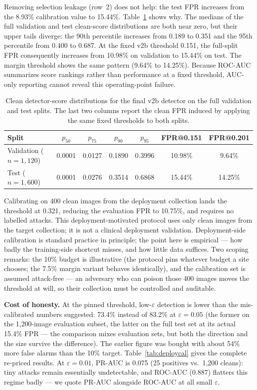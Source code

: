 \documentclass[runningheads]{llncs}
\begin{document}
Removing selection leakage (row~2) does not help: the test FPR increases
from the 8.93\% calibration value to 15.44\%. Table~\ref{tab:shift}
shows why. The medians of the full validation and test clean-score
distributions are both near zero, but their upper tails diverge: the
90th percentile increases from 0.189 to 0.351 and the 95th percentile
from 0.400 to 0.687. At the fixed v2b threshold 0.151, the full-split
FPR consequently increases from 10.98\% on validation to 15.44\% on
test. The margin threshold shows the same pattern (9.64\% to 14.25\%).
Because ROC-AUC summarizes score rankings rather than performance at a
fixed threshold, AUC-only reporting cannot reveal this operating-point
failure.

\begin{table}
\centering
\caption{Clean detector-score distributions for the final v2b detector
on the full validation and test splits. The last two columns report the
clean FPR induced by applying the same fixed thresholds to both splits.}
\label{tab:shift}
\begin{tabular}{lcccccc}
\toprule
Split & $p_{50}$ & $p_{75}$ & $p_{90}$ & $p_{95}$ & FPR@0.151 & FPR@0.201 \\
\midrule
Validation ($n{=}1{,}120$) & 0.0001 & 0.0127 & 0.1890 & 0.3996 & 10.98\% & 9.64\% \\
Test ($n{=}1{,}600$)       & 0.0001 & 0.0276 & 0.3514 & 0.6868 & 15.44\% & 14.25\% \\
\bottomrule
\end{tabular}
\end{table}

Calibrating on 400 clean images from the deployment collection lands the
threshold at 0.321, reducing the evaluation FPR to 10.75\%, and requires
no labelled attacks. This deployment-motivated protocol uses only clean
images from the target collection; it is not a clinical deployment
validation. Deployment-side calibration is standard practice in principle; the
point here is empirical --- how badly the training-side shortcut misses,
and how little data suffices.
Two scoping remarks: the 10\% budget is illustrative (the protocol pins
whatever budget a site chooses; the 7.5\% margin variant behaves
identically), and the calibration set is assumed attack-free --- an
adversary who can poison those 400 images moves the threshold at will,
so their collection must be controlled and auditable.

\textbf{Cost of honesty.} At the pinned threshold, low-$\varepsilon$
detection is lower than the mis-calibrated numbers suggested: 73.4\%
instead of 83.2\% at $\varepsilon=0.05$ (the former on the 1{,}200-image
evaluation subset, the latter on the full test set at its actual 15.4\%
FPR --- the comparison mixes evaluation sets, but both the direction and
the size survive the difference). The earlier figure was bought
with about 54\% more false alarms than the 10\% target.
Table~\ref{tab:deploycal} gives the complete re-priced results. At
$\varepsilon=0.01$, PR-AUC is 0.075 (25 positives vs.\ 1{,}200 cleans):
tiny attacks remain essentially undetectable, and ROC-AUC (0.887)
flatters this regime badly --- we quote PR-AUC alongside ROC-AUC at all
small $\varepsilon$.
\end{document}
